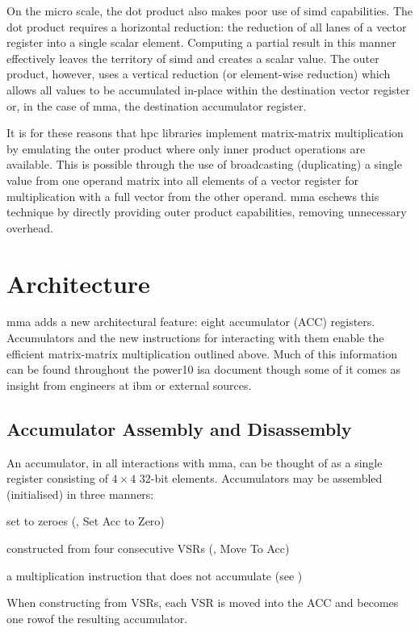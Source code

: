 \documentclass[\main/thesis.tex]{subfiles}
\begin{document}
On the micro scale, the dot product also makes poor use of \gls{simd} capabilities.
The dot product requires a horizontal reduction: the reduction of all lanes of a vector register into a single scalar element.
Computing a partial result in this manner effectively leaves the territory of \gls{simd} and creates a scalar value.
The outer product, however, uses a vertical reduction (or element-wise reduction) which allows all values to be accumulated in-place within the destination vector register or, in the case of \gls{mma}, the destination accumulator register.

It is for these reasons that \gls{hpc} libraries implement matrix-matrix multiplication by emulating the outer product where only inner product operations are available.
This is possible through the use of broadcasting (duplicating) a single value from one operand matrix into all elements of a vector register for multiplication with a full vector from the other operand.
\Gls{mma} eschews this technique by directly providing outer product capabilities, removing unnecessary overhead.

\section{Architecture}
\gls{mma} adds a new architectural feature: eight accumulator (ACC) registers.
Accumulators and the new instructions for interacting with them enable the efficient matrix-matrix multiplication outlined above.
Much of this information can be found throughout the \gls{power10} \gls{isa} document though some of it comes as insight from engineers at \gls{ibm} or external sources.

\subsection{Accumulator Assembly and Disassembly}
An accumulator, in all interactions with \gls{mma}, can be thought of as a single register consisting of $4 \times 4$ 32-bit elements.
Accumulators may be assembled (initialised) in three manners:
\begin{enumerate*}[itemjoin*={{ and }}, label=\textbf{(\arabic*)}, after={.}]
  \item set to zeroes (, Set Acc to Zero)
  \item constructed from four consecutive VSRs (, Move To Acc)
  \item a multiplication instruction that does not accumulate (see )
\end{enumerate*}
When constructing from VSRs, each VSR is moved into the ACC and becomes one row\footnotemark of the resulting accumulator.
\end{document}
